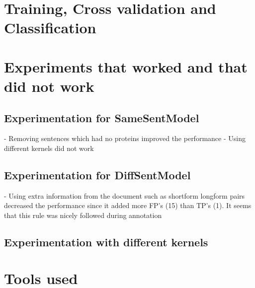 \section{Training, Cross validation and Classification}\label{sec:training}

\section{Experiments that worked and that did not work}\label{sec:experiments}

\subsection{Experimentation for SameSentModel}

- Removing sentences which had no proteins improved the performance
- Using different kernels did not work

\subsection{Experimentation for DiffSentModel}

- Using extra information from the document such as shortform longform pairs decreased the performance since it added more FP's (15) than TP's (1). It seems that this rule was nicely followed during annotation

\subsection{Experimentation with different kernels}

\section{Tools used}\label{sec:tools}

